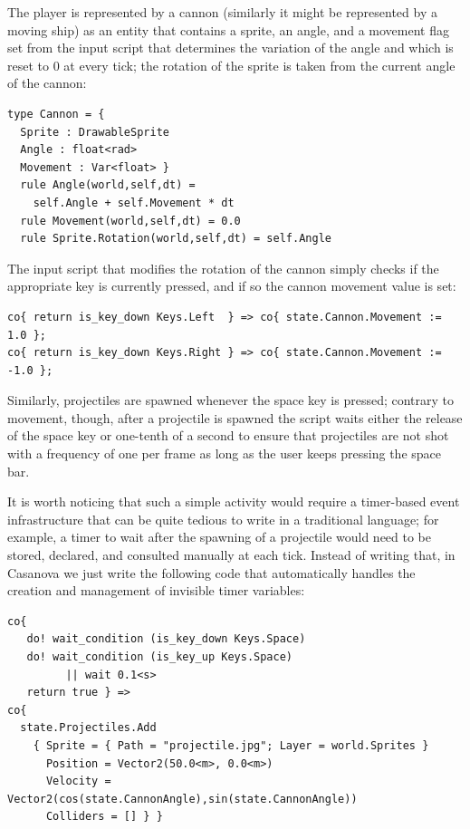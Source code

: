 The player is represented by a cannon (similarly it might be represented by a moving ship) as an entity that contains a sprite, an angle, and a movement flag set from the input script that determines the variation of the angle and which is reset to 0 at every tick; the rotation of the sprite is taken from the current angle of the cannon:

\begin{lstlisting}
type Cannon = {  
  Sprite : DrawableSprite 
  Angle : float<rad> 
  Movement : Var<float> } 
  rule Angle(world,self,dt) = 
    self.Angle + self.Movement * dt
  rule Movement(world,self,dt) = 0.0
  rule Sprite.Rotation(world,self,dt) = self.Angle 
\end{lstlisting}

The input script that modifies the rotation of the cannon simply checks if the appropriate key is currently pressed, and if so the cannon movement value is set:

\begin{lstlisting}
co{ return is_key_down Keys.Left  } => co{ state.Cannon.Movement := 1.0 }; 
co{ return is_key_down Keys.Right } => co{ state.Cannon.Movement := -1.0 };
\end{lstlisting}


Similarly, projectiles are spawned whenever the space key is pressed; contrary to movement, though, after a projectile is spawned the script waits either the release of the space key or one-tenth of a second to ensure that projectiles are not shot with a frequency of one per frame as long as the user keeps pressing the space bar. 

It is worth noticing that such a simple activity would require a timer-based event infrastructure that can be quite tedious to write in a traditional language; for example, a timer to wait after the spawning of a projectile would need to be stored, declared, and consulted manually at each tick. Instead of writing that, in Casanova we just write the following code that automatically handles the creation and management of invisible timer variables:

\begin{lstlisting}
co{ 
   do! wait_condition (is_key_down Keys.Space) 
   do! wait_condition (is_key_up Keys.Space)
         || wait 0.1<s>
   return true } =>
co{  
  state.Projectiles.Add 
    { Sprite = { Path = "projectile.jpg"; Layer = world.Sprites } 
      Position = Vector2(50.0<m>, 0.0<m>) 
      Velocity = Vector2(cos(state.CannonAngle),sin(state.CannonAngle))
      Colliders = [] } } 
\end{lstlisting}

